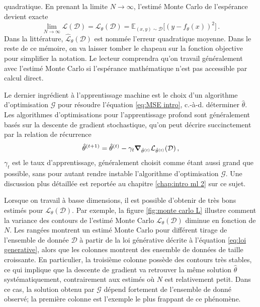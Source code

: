 quadratique. En prenant la limite $N \rightarrow \infty$, l'estimé Monte Carlo de l'espérance devient exacte
\begin{equation}
        \lim\limits_{N \rightarrow \infty}\hat{\mathcal{L}}(\mathcal{D}) = \mathcal{L}_{\theta}(\mathcal{D}) = \mathbb{E}_{(x, y) \sim \mathcal{D}} \big[(y - f_\theta(x))^2\big]\, .
\end{equation} 
Dans la littérature, $\hat{\mathcal{L}}_\theta(\mathcal{D})$ est nommée l'erreur quadratique moyenne. Dans le reste de ce mémoire, on va laisser 
tomber le chapeau sur la fonction objective pour simplifier la notation. Le lecteur comprendra qu'on travail généralement avec l'estimé 
Monte Carlo si l'espérance mathématique n'est pas accessible par calcul direct.

Le dernier ingrédient à l'apprentissage machine est le choix d'un algorithme d'optimisation $\mathcal{G}$ pour résoudre l'équation \eqref{eq:MSE intro}, c.-à-d. déterminer 
$\hat{\theta}$. Les algorithmes d'optimisations pour l'apprentissage profond sont généralement basés sur la descente de gradient stochastique, qu'on peut décrire succinctement 
par la relation de récurrence
\begin{equation}\label{eq:gd}
        \hat{\theta}^{(t+1)} = \hat{\theta}^{(t)} - \gamma_t \grad_{\hat{\theta}^{(t)}} \mathcal{L}_{\hat{\theta}^{(t)}}(\mathcal{D})\, ,
\end{equation} 
$\gamma_t$ est le taux d'apprentissage, généralement choisit comme étant aussi grand que possible, 
sans pour autant rendre instable l'algorithme d'optimisation $\mathcal{G}$. Une discussion plus détaillée est reportée au chapitre \ref{chap:intro ml 2} sur ce sujet.

Lorsque on travail à basse dimensions, il est possible d'obtenir de très bons estimés pour $\mathcal{L}_\theta(\mathcal{D})$. 
Par exemple, la figure \ref{fig:monte carlo L} illustre comment 
la variance des contours de l'estimé Monte Carlo $\mathcal{L}_{\theta}(\mathcal{D})$ diminue en fonction de $N$. 
Les rangées montrent un estimé Monte Carlo pour différent tirage de l'ensemble de donnée $\mathcal{D}$ à partir 
de la loi générative décrite à l'équation \eqref{eq:loi generative}, alors que les colonnes montrent  
des ensemble de données de taille croissante. En particulier, la troisième colonne possède des contours très stables, ce qui 
implique que la descente de gradient va retrouver la même solution $\hat{\theta}$ systématiquement, 
contrairement aux estimés où $N$ est relativement petit. Dans ce cas, la solution obtenu par $\mathcal{G}$ 
dépend fortement de l'ensemble de donné observé; la première colonne est l'exemple le plus frappant de ce phénomène.

